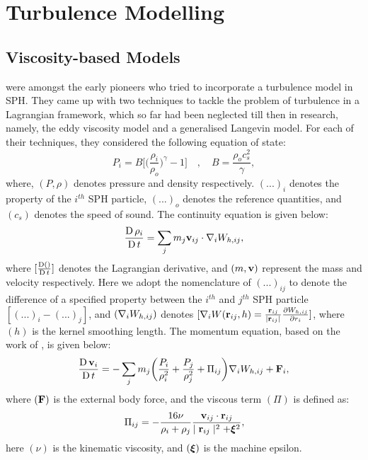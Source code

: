 
\chapter{Turbulence Modelling} %

\label{chap:turbulence-modelling}
\section{Viscosity-based Models}
\label{sec:visc-based-model}
\cite{VIOLEAU2002} were amongst the early pioneers who tried to incorporate a turbulence model in SPH. They came up with two techniques to tackle the problem of turbulence in a Lagrangian framework, which so far had been neglected till then in research, namely, the eddy viscosity model and a generalised Langevin model. For each of their techniques, they considered the following equation of state:
\begin{equation}
    P_i = B \Bigg[ \bigg( \frac{\rho_i}{\rho_o} \bigg)^{\gamma} - 1 \Bigg] \quad , \quad B = \frac{\rho_o c_s^2}{\gamma},
    \label{eq:violeau-eos}
\end{equation}
where, $(P, \rho)$ denotes pressure and density respectively. $(...)_i$ denotes the property of the $i^{th}$ SPH particle, $(...)_o$ denotes the reference quantities, and $(c_s)$ denotes the speed of sound.
The continuity equation is given below:
\begin{equation}
    \LagDerivative{\rho_i} = \sum_j m_j \VIJ \cdot \DWIJ,
    \label{eq:violeau-continuity}
\end{equation}
where $[\LagDerivative{()}]$ denotes the Lagrangian derivative, and $(m, \vect{v})$ represent the mass and velocity respectively.
Here we adopt the nomenclature of $(...)_{ij}$ to denote the difference of a specified property between the $i^{th}$ and $j^{th}$ SPH particle $[(...)_{i} - (...)_{j}]$, and $(\DWIJ)$ denotes $[\nabla_i W(\RIJ,h) = \frac{\RIJ}{\RtwoIJ[]} \PartialDerivative[r_i]{\WIJ}]$, where $(h)$ is the kernel smoothing length.
The momentum equation, based on the work of \cite{Monaghan1992}, is given below:   
\begin{equation}
    \LagDerivative{\vect{v}_i} = - \sum_j m_j \bigg( \frac{P_i}{\rho_i^2} + \frac{P_j}{\rho_j^2} + \Pi_{ij} \bigg) \DWIJ + \vect{F}_i,
    \label{eq:violeau-mom}
\end{equation}
where $(\vect{F})$ is the external body force, and the viscous term $(\Pi)$ is defined as:
\begin{equation}
    \Pi_{ij} = - \frac{16\nu}{\rho_i + \rho_j} \frac{\VIJ \cdot \RIJ}{\RtwoIJ + \MachineEpsilon^2},
    \label{eq:violeau-diffusion-term}
\end{equation}
here $(\nu)$ is the kinematic viscosity, and $(\MachineEpsilon)$ is the machine epsilon.


